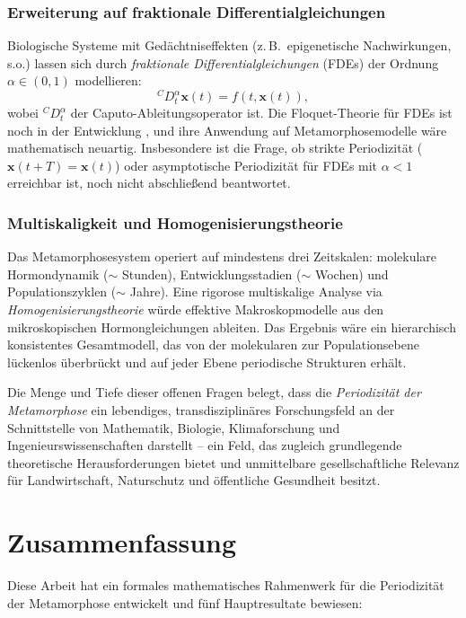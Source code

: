 ﻿\documentclass[12pt, a4paper]{article}
\theoremstyle{definition}
\begin{document}
\subsubsection{Erweiterung auf fraktionale Differentialgleichungen}
Biologische Systeme mit Gedächtniseffekten (z.\,B.\ epigenetische Nachwirkungen,
s.o.) lassen sich durch \emph{fraktionale Differentialgleichungen} (FDEs) der
Ordnung $\alpha \in (0,1)$ modellieren:
\[
  {}^C D^\alpha_t \bm{x}(t) = f(t, \bm{x}(t)),
\]
wobei ${}^C D^\alpha_t$ der Caputo-Ableitungsoperator ist. Die Floquet-Theorie für
FDEs ist noch in der Entwicklung \cite{Zhou2016}, und ihre Anwendung auf
Metamorphosemodelle wäre mathematisch neuartig. Insbesondere ist die Frage,
ob strikte Periodizität ($\bm{x}(t+T) = \bm{x}(t)$) oder asymptotische
Periodizität für FDEs mit $\alpha < 1$ erreichbar ist, noch nicht abschließend
beantwortet.

\subsubsection{Multiskaligkeit und Homogenisierungstheorie}
Das Metamorphosesystem operiert auf mindestens drei Zeitskalen: molekulare
Hormondynamik ($\sim$ Stunden), Entwicklungsstadien ($\sim$ Wochen) und
Populationszyklen ($\sim$ Jahre). Eine rigorose multiskalige Analyse via
\emph{Homogenisierungstheorie} \cite{Pavliotis2008} würde effektive
Makroskopmodelle aus den mikroskopischen Hormongleichungen ableiten. Das
Ergebnis wäre ein hierarchisch konsistentes Gesamtmodell, das von der
molekularen zur Populationsebene lückenlos überbrückt und auf jeder Ebene
periodische Strukturen erhält.

Die Menge und Tiefe dieser offenen Fragen belegt, dass die \emph{Periodizität der
Metamorphose} ein lebendiges, transdisziplinäres Forschungsfeld an der Schnittstelle
von Mathematik, Biologie, Klimaforschung und Ingenieurswissenschaften darstellt --
ein Feld, das zugleich grundlegende theoretische Herausforderungen bietet und
unmittelbare gesellschaftliche Relevanz für Landwirtschaft, Naturschutz und
öffentliche Gesundheit besitzt.

\section{Zusammenfassung}

Diese Arbeit hat ein formales mathematisches Rahmenwerk für die Periodizität der
Metamorphose entwickelt und fünf Hauptresultate bewiesen:
\end{document}
